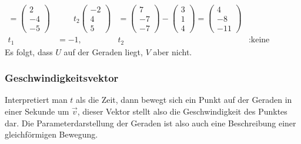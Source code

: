 \begin{beispiel}
\begin{align*}
=
\begin{pmatrix}2\\-4\\-5 \end{pmatrix}
&
\qquad
t_2
\begin{pmatrix}-2\\4\\5\end{pmatrix}
&=
\begin{pmatrix}7\\-7\\-7\end{pmatrix}
-
\begin{pmatrix}3\\1\\4 \end{pmatrix}
=
\begin{pmatrix}4\\-8\\-11\end{pmatrix}
\\
t_1&=-1,&t_2&:\text{keine Lösung.}
\end{align*}
Es folgt, dass $U$ auf der Geraden liegt, $V$ aber nicht.
\end{beispiel}

\subsubsection{Geschwindigkeitsvektor}
Interpretiert man $t$ als die Zeit, dann bewegt sich ein Punkt auf der Geraden in
einer Sekunde um $\vec v$, dieser Vektor stellt also die Geschwindigkeit
des Punktes dar.
Die Parameterdarstellung der Geraden ist also auch eine
Beschreibung einer gleichförmigen Bewegung.

